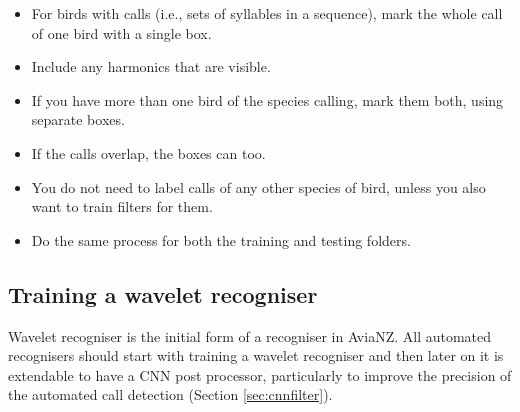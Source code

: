\documentclass{article}
\begin{document}
\begin{description}
\begin{itemize}
\item For birds with calls (i.e., sets of syllables in a sequence), mark the whole call of one bird with a single box. 
\item Include any harmonics that are visible. 
\item If you have more than one bird of the species calling, mark them both, using separate boxes. 
\item If the calls overlap, the boxes can too. 
\item You do not need to label calls of any other species of bird, unless you also want to train filters for them. 
\item Do the same process for both the training and testing folders.
\end{itemize}
\end{description}

\subsection{Training a wavelet recogniser}
Wavelet recogniser is the initial form of a recogniser in AviaNZ. All automated recognisers should start with training a wavelet recogniser and then later on  it is extendable to have a CNN post processor, particularly to improve the precision of the automated call detection (Section \ref{sec:cnnfilter}).   
\end{document}
